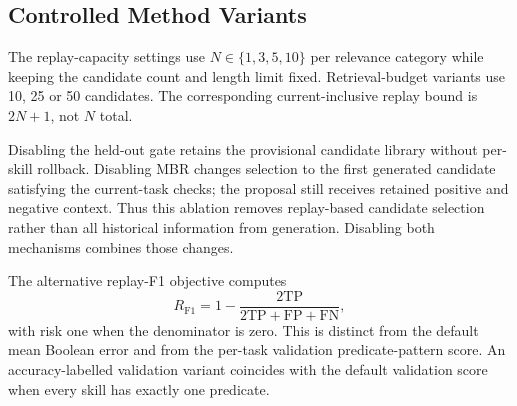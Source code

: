 \subsection{Controlled Method Variants}
\label{app:implementation-variants}
The replay-capacity settings use $N\in\{1,3,5,10\}$ per relevance category while keeping the candidate count and length limit fixed. Retrieval-budget variants use 10, 25 or 50 candidates. The corresponding current-inclusive replay bound is $2N+1$, not $N$ total.

Disabling the held-out gate retains the provisional candidate library without per-skill rollback. Disabling MBR changes selection to the first generated candidate satisfying the current-task checks; the proposal still receives retained positive and negative context. Thus this ablation removes replay-based candidate selection rather than all historical information from generation. Disabling both mechanisms combines those changes.

The alternative replay-F1 objective computes
\[
R_{\mathrm{F1}}=1-\frac{2\mathrm{TP}}{2\mathrm{TP}+\mathrm{FP}+\mathrm{FN}},
\]
with risk one when the denominator is zero. This is distinct from the default mean Boolean error and from the per-task validation predicate-pattern score. An accuracy-labelled validation variant coincides with the default validation score when every skill has exactly one predicate.
